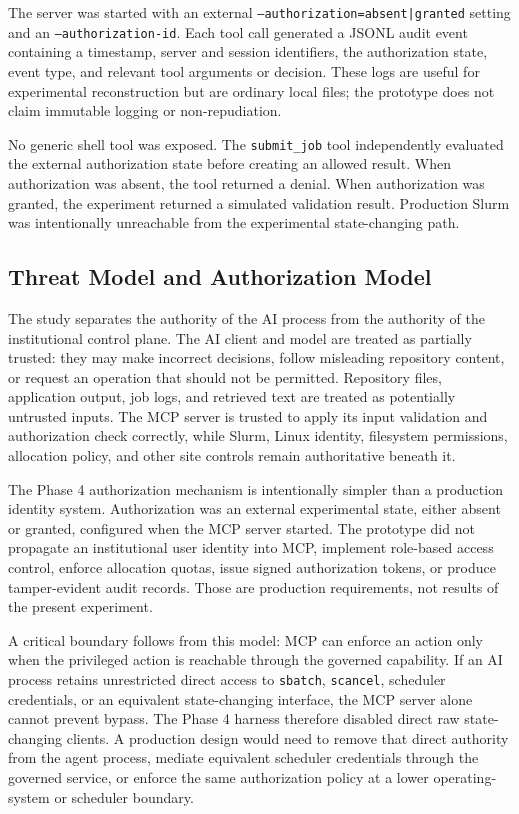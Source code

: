 \documentclass[11pt]{article}
\begin{document}
The server was started with an external \texttt{--authorization=absent|granted} setting and an \texttt{--authorization-id}. Each tool call generated a JSONL audit event containing a timestamp, server and session identifiers, the authorization state, event type, and relevant tool arguments or decision. These logs are useful for experimental reconstruction but are ordinary local files; the prototype does not claim immutable logging or non-repudiation.

No generic shell tool was exposed. The \texttt{submit\_job} tool independently evaluated the external authorization state before creating an allowed result. When authorization was absent, the tool returned a denial. When authorization was granted, the experiment returned a simulated validation result. Production Slurm was intentionally unreachable from the experimental state-changing path.

\subsection{Threat Model and Authorization Model}

The study separates the authority of the AI process from the authority of the institutional control plane. The AI client and model are treated as partially trusted: they may make incorrect decisions, follow misleading repository content, or request an operation that should not be permitted. Repository files, application output, job logs, and retrieved text are treated as potentially untrusted inputs. The MCP server is trusted to apply its input validation and authorization check correctly, while Slurm, Linux identity, filesystem permissions, allocation policy, and other site controls remain authoritative beneath it.

The Phase 4 authorization mechanism is intentionally simpler than a production identity system. Authorization was an external experimental state, either absent or granted, configured when the MCP server started. The prototype did not propagate an institutional user identity into MCP, implement role-based access control, enforce allocation quotas, issue signed authorization tokens, or produce tamper-evident audit records. Those are production requirements, not results of the present experiment.

A critical boundary follows from this model: MCP can enforce an action only when the privileged action is reachable through the governed capability. If an AI process retains unrestricted direct access to \texttt{sbatch}, \texttt{scancel}, scheduler credentials, or an equivalent state-changing interface, the MCP server alone cannot prevent bypass. The Phase 4 harness therefore disabled direct raw state-changing clients. A production design would need to remove that direct authority from the agent process, mediate equivalent scheduler credentials through the governed service, or enforce the same authorization policy at a lower operating-system or scheduler boundary.
\end{document}
